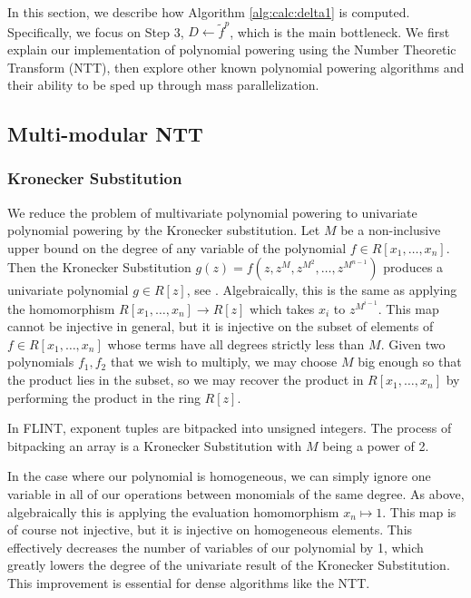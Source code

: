 In this section, we describe how Algorithm \ref{alg:calc:delta1} 
is computed. Specifically, we focus on Step 3, 
\(D \gets \tilde{f}^{p}\), which is the main 
bottleneck. We first explain our implementation 
of polynomial powering using the Number Theoretic 
Transform (NTT), then explore other known polynomial 
powering algorithms and their ability to be sped up 
through mass parallelization.

\subsection{Multi-modular NTT}

\subsubsection{Kronecker Substitution}
We reduce the problem of multivariate 
polynomial powering to univariate polynomial powering
by the Kronecker substitution.
Let $M$ be a non-inclusive upper bound on the degree of any variable of the polynomial
$f \in R[x_1, \dots, x_n]$. 
Then the Kronecker Substitution 
\(g(z) = f(z, z^M, z^{M^2}, \dots, z^{M^{n-1}})\)
produces a univariate polynomial $g \in R[z]$,
see \cite{arnold-2014-kronecker}.
Algebraically, this is the same as applying the 
homomorphism 
\(R[x_{1}, \ldots, x_{n}] \xrightarrow{} R[z]\)
which takes \(x_{i}\) to
\(z^{M^{i-1}}\).
This map cannot be injective in general, but it
is injective on the subset of elements of
\(f \in R[x_{1}, \ldots, x_{n}]\) 
whose terms have all degrees strictly less than \(M\).
Given two polynomials \(f_{1}, f_{2}\) that
we wish to multiply, we may choose \(M\)
big enough
so that the product lies in the subset,
so we may recover the product in 
\(R[x_{1}, \ldots, x_{n}]\) by performing
the product in the ring \(R[z]\).

\begin{rmk}
    In FLINT, exponent tuples are bitpacked into unsigned 
    integers. The process of bitpacking an array is a 
    Kronecker Substitution with $M$ being a power of 2.
\end{rmk}

In the case where our polynomial is homogeneous, 
we can simply ignore one variable in all of our 
operations between monomials of the same degree. 
As above, algebraically this is applying the evaluation
homomorphism \(x_{n} \mapsto 1\).
This map is of course not injective, but it is injective on homogeneous elements.
This effectively decreases the number of variables of our polynomial by 1, 
which greatly lowers the degree of the univariate result of the
Kronecker Substitution.
This improvement is essential for dense algorithms like the NTT.

